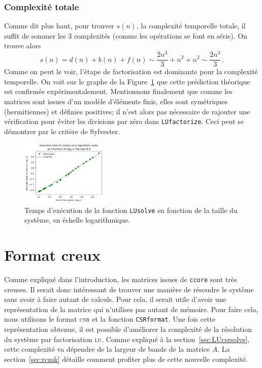 \documentclass[11pt]{article}
\begin{document}
\subsubsection{Complexité totale}
Comme dit plus haut, pour trouver $s(n)$, la complexité temporelle totale, il suffit de sommer les 3 complexités (comme les opérations se font en série).
On trouve alors
\[
s(n) = d(n) + b(n) + f(n) \sim \frac{2n^3}{3} + n^2 + n^2 \sim \frac{2n^3}{3}\,.
\]
Comme on peut le voir, l'étape de factorisation est dominante pour la complexité temporelle. On voit sur le graphe de la Figure~\ref{fig:lusolve_time} que cette prédiction théorique est confirmée expérimentalement. Mentionnons finalement que comme les matrices sont issues d'un modèle d'éléments finis, elles sont symétriques (hermitiennes) et définies positives; il n'est alors pas nécessaire de rajouter une vérification pour éviter les divisions par zéro dans \lstinline|LUfactorize|. Ceci peut se démontrer par le critère de Sylvester.
\begin{figure}[H]
	\centering
	\includegraphics[width=0.37\textwidth]{lusolve_time.png}
	\caption{Temps d'exécution de la fonction \lstinline|LUsolve| en fonction de la taille du système, en échelle logarithmique.}
	\label{fig:lusolve_time}
\end{figure}

\section{Format creux}
Comme expliqué dans l'introduction, les matrices issues de \lstinline[language=bash]|ccore| sont très creuses.
Il serait donc intéressant de trouver une manière de résoudre le système sans avoir à faire autant de calculs. Pour cela, il serait utile d'avoir une représentation de la matrice qui n'utilises pas autant de mémoire.
Pour faire cela, nous utilisons le format \textsc{csr} et la fonction \lstinline|CSRformat|.
Une fois cette représentation obtenue, il est possible d'améliorer la complexité de la résolution du système par factorisation \textsc{lu}.
Comme expliqué à la section~\ref{sec:LUcsrsolve}, cette complexité va dépendre de la largeur de bande de la matrice $A$.
La section~\ref{sec:rcmk} détaille comment profiter plus de cette nouvelle complexité.
\end{document}
